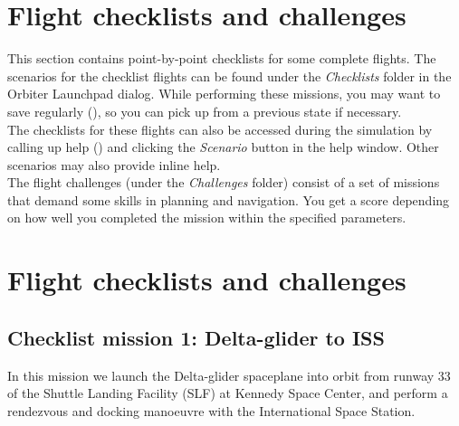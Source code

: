 \documentclass[Orbiter User Manual.tex]{subfiles}
\begin{document}
\section{Flight checklists and challenges}
This section contains point-by-point checklists for some complete flights. The scenarios for the checklist flights can be found under the \textit{Checklists} folder in the Orbiter Launchpad dialog. While performing these missions, you may want to save regularly (\Ctrl{}), so you can pick up from a previous state if necessary.\\
The checklists for these flights can also be accessed during the simulation by calling up help (\Alt{}) and clicking the \textit{Scenario} button in the help window. Other scenarios may also provide inline help.\\
The flight challenges (under the \textit{Challenges} folder) consist of a set of missions that demand some skills in planning and navigation. You get a score depending on how well you completed the mission within the specified parameters.\section{Flight checklists and challenges}


\subsection{Checklist mission 1: Delta-glider to ISS}
In this mission we launch the Delta-glider spaceplane into orbit from runway 33 of the Shuttle Landing Facility (SLF) at Kennedy Space Center, and perform a rendezvous and docking manoeuvre with the International Space Station.
\end{document}
